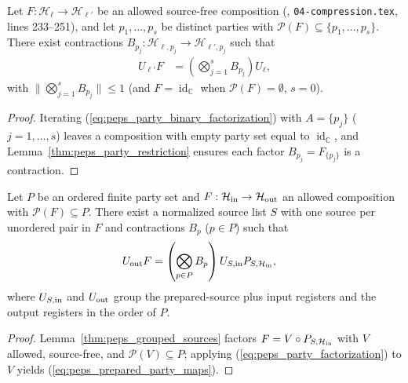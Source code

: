 \begin{lemma}
    \label{thm:peps_party_factorization}
    \leanok
    Let $F:\mathcal H_\ell\to\mathcal H_{\ell'}$ be an allowed source-free composition (\cite[proof of Theorem~5.2]{OpenAI2026PolynomialPEPS}, \texttt{04-compression.tex}, lines 233--251), and let $p_1,\ldots,p_s$ be distinct parties with $\mathcal P(F)\subseteq\{p_1,\ldots,p_s\}$. There exist contractions $B_{p_j}:\mathcal H_{\ell,p_j}\to\mathcal H_{\ell',p_j}$ such that
    \begin{align}
        U_{\ell'}F
         & =\left(\bigotimes_{j=1}^s B_{p_j}\right)U_\ell,
        \label{eq:peps_party_factorization}
    \end{align}
    with $\bigl\|\bigotimes_{j=1}^s B_{p_j}\bigr\|\le1$ (and $F=\operatorname{id}_{\mathbb C}$ when $\mathcal P(F)=\emptyset$, $s=0$).
\end{lemma}

\begin{proof}\leanok
    Iterating (\ref{eq:peps_party_binary_factorization}) with $A=\{p_j\}$ ($j=1,\ldots,s$) leaves a composition with empty party set equal to $\operatorname{id}_{\mathbb C}$, and Lemma~\ref{thm:peps_party_restriction} ensures each factor $B_{p_j}=F_{\{p_j\}}$ is a contraction.
\end{proof}

\begin{lemma}
    \label{thm:peps_prepared_party_maps}
    \leanok
    Let $P$ be an ordered finite party set and $F:\mathcal H_{\rm in}\to\mathcal H_{\rm out}$ an allowed composition with $\mathcal P(F)\subseteq P$. There exist a normalized source list $S$ with one source per unordered pair in $F$ and contractions $B_p$ ($p\in P$) such that
    \begin{align}
        U_{\rm out}F
         & =\left(\bigotimes_{p\in P}B_p\right)
        U_{S,\rm in}P_{S,\mathcal H_{\rm in}},
        \label{eq:peps_prepared_party_maps}
    \end{align}
    where $U_{S,\rm in}$ and $U_{\rm out}$ group the prepared-source plus input registers and the output registers in the order of $P$.
\end{lemma}

\begin{proof}\leanok
    Lemma~\ref{thm:peps_grouped_sources} factors $F=V\circ P_{S,\mathcal H_{\rm in}}$ with $V$ allowed, source-free, and $\mathcal P(V)\subseteq P$; applying (\ref{eq:peps_party_factorization}) to $V$ yields (\ref{eq:peps_prepared_party_maps}).
\end{proof}


